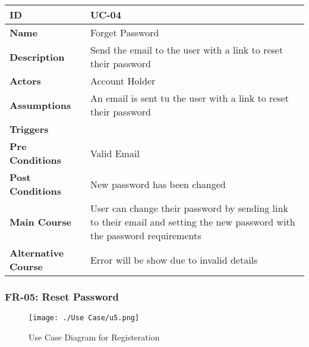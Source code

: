     \begin{center}
        \begin{tabularx}{\textwidth}{|l|X|}
            \hline
            \textbf{ID} & UC-04 \\
            \hline
            \textbf{Name} & Forget Password \\
            \hline
            \textbf{Description} & Send the email to the user with a link to reset their password \\
            \hline
            \textbf{Actors} & Account Holder \\
            \hline
            \textbf{Assumptions} & An email is sent tu the user with a link to reset their password \\
            \hline
            \textbf{Triggers} &  \\
            \hline
            \textbf{Pre Conditions} & Valid Email \\
            \hline
            \textbf{Post Conditions} & New password has been changed \\
            \hline
            \textbf{Main Course} & User can change their password by sending link to their email and setting the new password with the password requirements \\
            \hline
            \textbf{Alternative Course} & Error will be show due to invalid details \\
            \hline
            
        \end{tabularx}
    \end{center}
    \newpage
    

    \subsubsection{FR-05: Reset Password}
    \begin{figure}[H]
        \texttt{[image: ./Use Case/u5.png]}
        \centering 
        \caption{Use Case Diagram for Registeration}
        \label{fig:prototype1}
        \end{figure}
        
